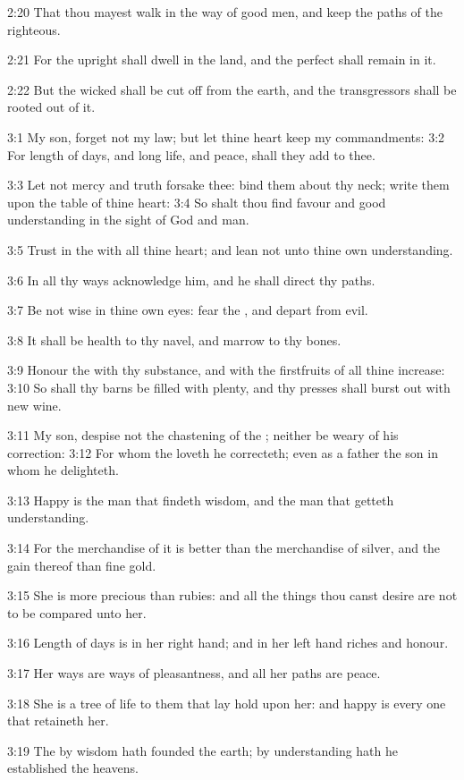 2:20 That thou mayest walk in the way of good men, and keep the paths
of the righteous.

2:21 For the upright shall dwell in the land, and the perfect shall
remain in it.

2:22 But the wicked shall be cut off from the earth, and the
transgressors shall be rooted out of it.

3:1 My son, forget not my law; but let thine heart keep my
commandments: 3:2 For length of days, and long life, and peace, shall
they add to thee.

3:3 Let not mercy and truth forsake thee: bind them about thy neck;
write them upon the table of thine heart: 3:4 So shalt thou find
favour and good understanding in the sight of God and man.

3:5 Trust in the \LORD with all thine heart; and lean not unto thine
own understanding.

3:6 In all thy ways acknowledge him, and he shall direct thy paths.

3:7 Be not wise in thine own eyes: fear the \LORD, and depart from
evil.

3:8 It shall be health to thy navel, and marrow to thy bones.

3:9 Honour the \LORD with thy substance, and with the firstfruits of
all thine increase: 3:10 So shall thy barns be filled with plenty, and
thy presses shall burst out with new wine.

3:11 My son, despise not the chastening of the \LORD; neither be weary
of his correction: 3:12 For whom the \LORD loveth he correcteth; even
as a father the son in whom he delighteth.

3:13 Happy is the man that findeth wisdom, and the man that getteth
understanding.

3:14 For the merchandise of it is better than the merchandise of
silver, and the gain thereof than fine gold.

3:15 She is more precious than rubies: and all the things thou canst
desire are not to be compared unto her.

3:16 Length of days is in her right hand; and in her left hand riches
and honour.

3:17 Her ways are ways of pleasantness, and all her paths are peace.

3:18 She is a tree of life to them that lay hold upon her: and happy
is every one that retaineth her.

3:19 The \LORD by wisdom hath founded the earth; by understanding hath
he established the heavens.

